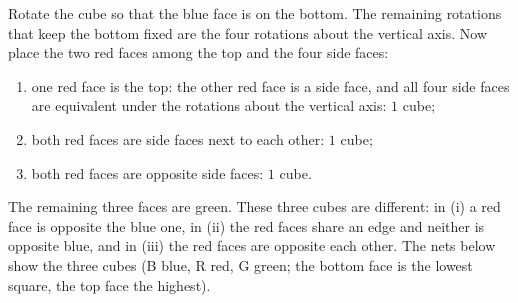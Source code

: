 Rotate the cube so that the blue face is on the bottom. The remaining rotations that keep the bottom fixed are the four rotations about the vertical axis. Now place the two red faces among the top and the four side faces:
\begin{enumerate}
\item[(i)] one red face is the top: the other red face is a side face, and all four side faces are equivalent under the rotations about the vertical axis: $1$ cube;
\item[(ii)] both red faces are side faces next to each other: $1$ cube;
\item[(iii)] both red faces are opposite side faces: $1$ cube.
\end{enumerate}
The remaining three faces are green. These three cubes are different: in (i) a red face is opposite the blue one, in (ii) the red faces share an edge and neither is opposite blue, and in (iii) the red faces are opposite each other. The nets below show the three cubes (B blue, R red, G green; the bottom face is the lowest square, the top face the highest).

